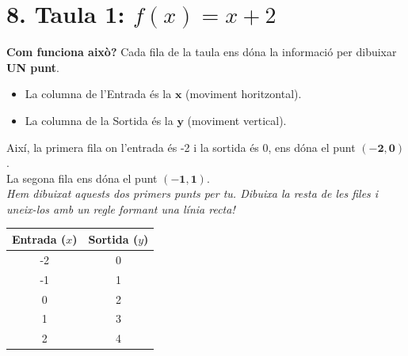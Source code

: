 \documentclass[12pt,a4paper]{article}
\begin{document}
\section*{8. Taula 1: $f(x) = x + 2$}

\textbf{Com funciona això?} Cada fila de la taula ens dóna la informació per dibuixar \textbf{UN punt}. 
\begin{itemize}
    \item La columna de l'Entrada és la $\mathbf{x}$ (moviment horitzontal).
    \item La columna de la Sortida és la $\mathbf{y}$ (moviment vertical).
\end{itemize}

Així, la primera fila on l'entrada és -2 i la sortida és 0, ens dóna el punt $\mathbf{(-2, 0)}$. \\
La segona fila ens dóna el punt $\mathbf{(-1, 1)}$. \\
\textit{Hem dibuixat aquests dos primers punts per tu. Dibuixa la resta de les files i uneix-los amb un regle formant una línia recta!}

\vspace{0.3cm}

\noindent
\begin{minipage}[c]{0.40\textwidth}
    \renewcommand{\arraystretch}{1.5}
    \begin{tabular}{|c|c|}
        \hline
        \textbf{Entrada ($x$)} & \textbf{Sortida ($y$)} \\ \hline
        -2 & 0 \\ \hline
        -1 & 1 \\ \hline
         0 & 2 \\ \hline
         1 & 3 \\ \hline
         2 & 4 \\ \hline
    \end{tabular}
\end{minipage}%
\hfill
\begin{minipage}[c]{0.55\textwidth}
\end{minipage}
\end{document}
